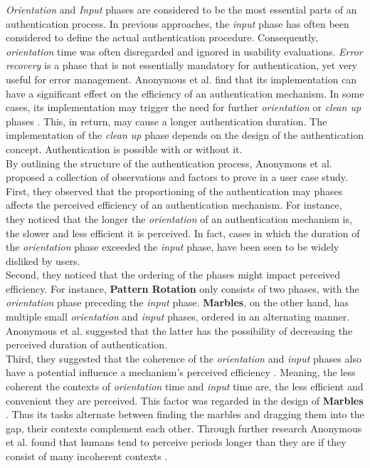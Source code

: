 \textit{Orientation} and \textit{Input} phases are considered to be the most essential parts of an authentication process. In previous approaches, the \textit{input} phase has often been considered to define the actual authentication procedure. Consequently, \textit{orientation} time was often disregarded and ignored in usability evaluations. \textit{Error recovery} is a phase that is not essentially mandatory for authentication, yet very useful for error management. Anonymous et al. \cite{anonymous} find that its implementation can have a significant effect on the efficiency of an authentication mechanism. In some cases, its implementation may trigger the need for further \textit{orientation} or \textit{clean up} phases \cite{anonymous}. This, in return, may cause a longer authentication duration. The implementation of the \textit{clean up} phase depends on the design of the authentication concept. Authentication is possible with or without it. \\

By outlining the structure of the authentication process, Anonymous et al. \cite{anonymous} proposed a collection of observations and factors to prove in a user case study. First, they observed that the proportioning of the authentication may phases affects the perceived efficiency of an authentication mechanism. For instance, they noticed that the longer the \textit{orientation} of an authentication mechanism is, the slower and less efficient it is perceived. In fact, cases in which the duration of the \textit{orientation} phase exceeded the \textit{input} phase, have been seen to be widely disliked by users. \\

Second, they noticed that the ordering of the phases might impact perceived efficiency. For instance, \textbf{Pattern Rotation} only consists of two phases, with the \textit{orientation} phase preceding the \textit{input} phase. \textbf{Marbles}, on the other hand, has multiple small \textit{orientation} and \textit{input} phases, ordered in an alternating manner. Anonymous et al. \cite{anonymous} suggested that the latter has the possibility of decreasing the perceived duration of authentication. \\

Third, they suggested that the coherence of the \textit{orientation} and \textit{input} phases also have a potential influence a mechanism's perceived efficiency \cite{anonymous}. Meaning, the less coherent the contexts of \textit{orientation} time and \textit{input} time are, the less efficient and convenient they are perceived. This factor was regarded in the design of \textbf{Marbles} \cite{Marbles}. Thus its tasks alternate between finding the marbles and dragging them into the gap, their contexts complement each other. Through further research Anonymous et al. \cite{anonymous} found that humans tend to perceive periods longer than they are if they consist of many incoherent contexts \cite{anonymous,perception}.\\


